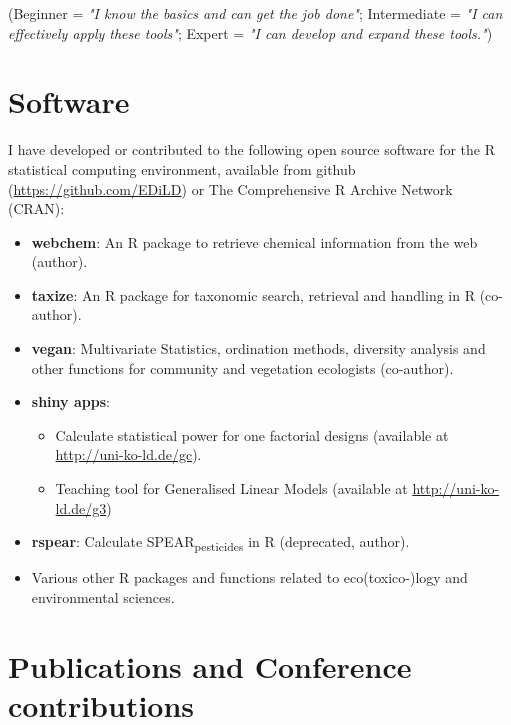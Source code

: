 \documentclass[11pt,a4paper,sans]{moderncv}   %
\newcommand*{\boldname}[3]{%
  \def\lastname{#1}%
  \def\firstname{#2}%
  \def\firstinit{#3}}
\begin{document}
(Beginner = \emph{"I know the basics and can get the job done"}; Intermediate = \emph{"I can effectively apply these tools"}; Expert = \emph{"I can develop and expand these tools."})
\vspace{1em}


\section{Software}
I have developed or contributed to the following open source software for the R statistical computing environment, available from github (\url{https://github.com/EDiLD}) or The Comprehensive R Archive Network (CRAN):
\vspace{0.5em}
\begin{itemize}
     \item \textbf{webchem}: An R package to retrieve chemical information from the web (author).
	\item \textbf{taxize}: An R package for taxonomic search, retrieval and handling in R (co-author).
	\item \textbf{vegan}: Multivariate Statistics, ordination methods, diversity analysis and other functions for community and vegetation ecologists (co-author).
	\item \textbf{shiny apps}: 
    \begin{itemize}
      \item Calculate statistical power for one factorial designs (available at \url{http://uni-ko-ld.de/gc}).
      \item Teaching tool for Generalised Linear Models (available at \url{http://uni-ko-ld.de/g3})
    \end{itemize}

  \item \textbf{rspear}: Calculate SPEAR\textsubscript{pesticides} in R (deprecated, author).
	\item Various other R packages and functions related to eco(toxico-)logy and environmental sciences.
\end{itemize}

\newpage

\section{Publications and Conference contributions}
\begin{refsection}[papers]
  \nocite{*}
  \boldname{Szöcs}{}{}
  \printbibliography[title={Articles}, heading=subbibliography]
\end{refsection}
\end{document}
